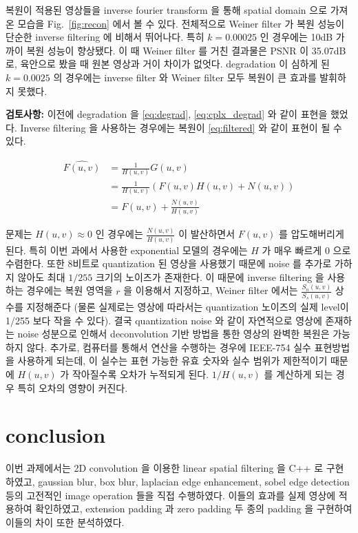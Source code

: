 \documentclass[a4paper, 12p]{paper}
\begin{document}
복원이 적용된 영상들을 inverse fourier transform 을 통해 spatial domain 으로 가져온 모습을 Fig.~\ref{fig:recon} 에서 볼 수 있다. 전체적으로 Weiner filter 가 복원 성능이 단순한 inverse filtering 에 비해서 뛰어나다. 특히 $k=0.00025$ 인 경우에는 10dB 가까이 복원 성능이 향상됐다. 이 때 Weiner filter 를 거친 결과물은 PSNR 이 35.07dB로, 육안으로 봤을 때 원본 영상과 거이 차이가 없엇다. degradation 이 심하게 된 $k=0.0025$ 의 경우에는 inverse filter 와 Weiner filter 모두 복원이 큰 효과를 발휘하지 못했다.

\vspace{0.1in}
\noindent\textbf{검토사항:} 이전에 degradation 을 \eqref{eq:degrad}, \eqref{eq:cplx_degrad} 와 같이 표현을 했었다. Inverse filtering 을 사용하는 경우에는 복원이 \eqref{eq:filtered} 와 같이 표현이 될 수 있다.

\begin{align}
  \hat{F(u, v)} &= \frac{1}{H(u, v)}G(u, v) \\
                &= \frac{1}{H(u, v)}(F(u, v)H(u, v) + N(u, v)) \\
                &= F(u, v) + \frac{N(u, v)}{H(u, v)} \label{eq:filtered}
\end{align}

문제는 $H(u, v) \approx 0$ 인 경우에는 $\frac{N(u, v)}{H(u, v)}$ 이 발산하면서 $F(u, v)$ 를 압도해버리게 된다. 특히 이번 과에서 사용한 exponential 모델의 경우에는 $H$ 가 매우 빠르게 0 으로 수렴한다. 또한 8비트로 quantization 된 영상을 사용했기 때문에 noise 를 추가로 가하지 않아도 최대 $1/255$ 크기의 노이즈가 존재한다. 이 때문에 inverse filtering 을 사용하는 경우에는 복원 영역을 $r$ 을 이용해서 지정하고, Weiner filter 에서는 $\frac{S_n(u, v)}{S_s(u, v)}$ 상수를 지정해준다 (물론 실제로는 영상에 따라서는 quantization 노이즈의 실제 level이 1/255 보다 작을 수 있다). 결국 quantization noise 와 같이 자연적으로 영상에 존재하는 noise 성분으로 인해서 deconvolution 기반 방법을 통한 영상의 완벽한 복원은 가능하지 않다. 추가로, 컴퓨터를 통해서 연산을 수행하는 경우에 IEEE-754 실수 표현방법을 사용하게 되는데, 이 실수는 표현 가능한 유효 숫자와 실수 범위가 제한적이기 때문에 $H(u, v)$ 가 작아질수록 오차가 누적되게 된다. $1/H(u, v)$ 를 계산하게 되는 경우 특히 오차의 영향이 커진다.


\section{conclusion}
이번 과제에서는 2D convolution 을 이용한 linear spatial filtering 을 C++ 로 구현하였고, gaussian blur, box blur, laplacian edge enhancement, sobel edge detection 등의 고전적인 image operation 들을 직접 수행하였다. 이들의 효과를 실제 영상에 적용하여 확인하였고, extension padding 과 zero padding 두 종의 padding 을 구현하여 이들의 차이 또한 분석하였다.
\end{document}
